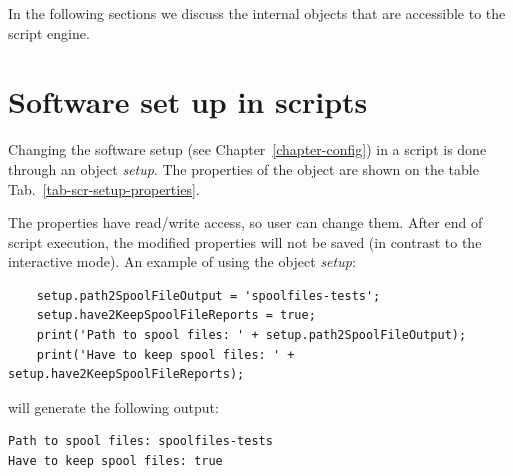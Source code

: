\documentclass [10pt,letterpaper]{report}
\begin{document}
In the following sections we discuss the internal objects that are accessible
to the script engine.




\section{Software set up in scripts}
\label{section-scripting-setup}
Changing the software setup (see Chapter~\ref{chapter-config}) in a script is done
through an object {\sl setup}.
The properties of the object are shown on the table
Tab.~\ref{tab-scr-setup-properties}.

The properties have read/write access, so user can change them. After end of script
execution, the modified properties will not be saved (in contrast to the interactive
mode). An example of using the object {\sl setup}:
{\small\begin{verbatim}
    setup.path2SpoolFileOutput = 'spoolfiles-tests';
    setup.have2KeepSpoolFileReports = true;
    print('Path to spool files: ' + setup.path2SpoolFileOutput);
    print('Have to keep spool files: ' + setup.have2KeepSpoolFileReports);
\end{verbatim}}
\noindent
will generate the following output:
{\small\begin{verbatim}
Path to spool files: spoolfiles-tests
Have to keep spool files: true
\end{verbatim}}
\end{document}
